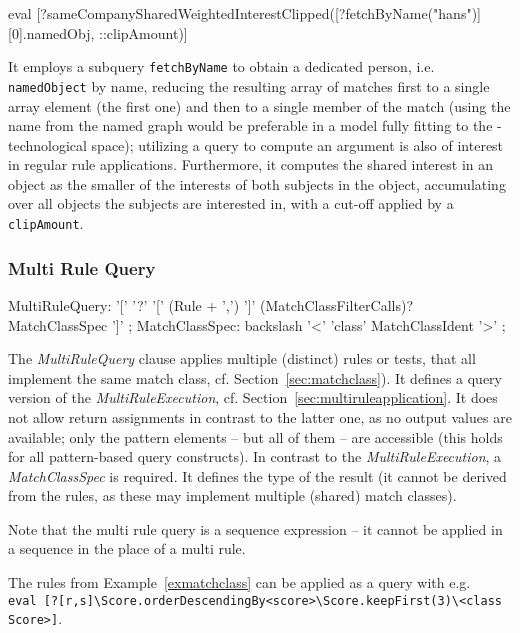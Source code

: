 \begin{example}
  \begin{grshell}
eval [?sameCompanySharedWeightedInterestClipped([?fetchByName("hans")][0].namedObj, ::clipAmount)]
  \end{grshell}
	
It employs a subquery \texttt{fetchByName} to obtain a dedicated person, i.e. \texttt{namedObject} by name, reducing the resulting array of matches first to a single array element (the first one) and then to a single member of the match (using the name from the named graph would be preferable in a model fully fitting to the \GrG-technological space); utilizing a query to compute an argument is also of interest in regular rule applications.
Furthermore, it computes the shared interest in an object as the smaller of the interests of both subjects in the object, accumulating over all objects the subjects are interested in, with a cut-off applied by a \texttt{clipAmount}.
\end{example}

\subsubsection*{Multi Rule Query}

\begin{rail}
  MultiRuleQuery: '[' '?' '[' (Rule + ',') ']' (MatchClassFilterCalls)? MatchClassSpec ']' ;
  MatchClassSpec: backslash '<' 'class' MatchClassIdent '>' ;
\end{rail}

The \emph{MultiRuleQuery} clause applies multiple (distinct) rules or tests, that all implement the same match class, cf. Section~\ref{sec:matchclass}).
It defines a query version of the \emph{MultiRuleExecution}, cf. Section~\ref{sec:multiruleapplication}.
It does not allow return assignments in contrast to the latter one, as no output values are available; only the pattern elements -- but all of them -- are accessible (this holds for all pattern-based query constructs).
In contrast to the \emph{MultiRuleExecution}, a \emph{MatchClassSpec} is required.
It defines the type of the result (it cannot be derived from the rules, as these may implement multiple (shared) match classes).

Note that the multi rule query is a sequence expression -- it cannot be applied in a sequence in the place of a multi rule.

\begin{example}
The rules from Example~\ref{exmatchclass} can be applied as a query with e.g. \\
\verb#eval [?[r,s]\Score.orderDescendingBy<score>\Score.keepFirst(3)\<class Score>]#.
\end{example}


